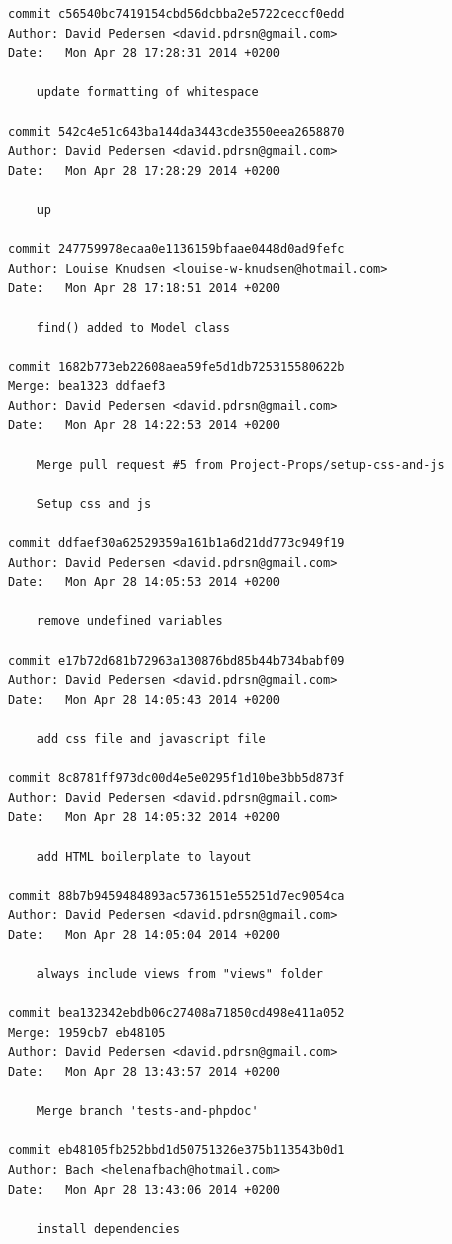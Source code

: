 \documentclass[12pt]{article}
\begin{document}
\begin{verbatim}
commit c56540bc7419154cbd56dcbba2e5722ceccf0edd
Author: David Pedersen <david.pdrsn@gmail.com>
Date:   Mon Apr 28 17:28:31 2014 +0200

    update formatting of whitespace

commit 542c4e51c643ba144da3443cde3550eea2658870
Author: David Pedersen <david.pdrsn@gmail.com>
Date:   Mon Apr 28 17:28:29 2014 +0200

    up

commit 247759978ecaa0e1136159bfaae0448d0ad9fefc
Author: Louise Knudsen <louise-w-knudsen@hotmail.com>
Date:   Mon Apr 28 17:18:51 2014 +0200

    find() added to Model class

commit 1682b773eb22608aea59fe5d1db725315580622b
Merge: bea1323 ddfaef3
Author: David Pedersen <david.pdrsn@gmail.com>
Date:   Mon Apr 28 14:22:53 2014 +0200

    Merge pull request #5 from Project-Props/setup-css-and-js
    
    Setup css and js

commit ddfaef30a62529359a161b1a6d21dd773c949f19
Author: David Pedersen <david.pdrsn@gmail.com>
Date:   Mon Apr 28 14:05:53 2014 +0200

    remove undefined variables

commit e17b72d681b72963a130876bd85b44b734babf09
Author: David Pedersen <david.pdrsn@gmail.com>
Date:   Mon Apr 28 14:05:43 2014 +0200

    add css file and javascript file

commit 8c8781ff973dc00d4e5e0295f1d10be3bb5d873f
Author: David Pedersen <david.pdrsn@gmail.com>
Date:   Mon Apr 28 14:05:32 2014 +0200

    add HTML boilerplate to layout

commit 88b7b9459484893ac5736151e55251d7ec9054ca
Author: David Pedersen <david.pdrsn@gmail.com>
Date:   Mon Apr 28 14:05:04 2014 +0200

    always include views from "views" folder

commit bea132342ebdb06c27408a71850cd498e411a052
Merge: 1959cb7 eb48105
Author: David Pedersen <david.pdrsn@gmail.com>
Date:   Mon Apr 28 13:43:57 2014 +0200

    Merge branch 'tests-and-phpdoc'

commit eb48105fb252bbd1d50751326e375b113543b0d1
Author: Bach <helenafbach@hotmail.com>
Date:   Mon Apr 28 13:43:06 2014 +0200

    install dependencies


\end{verbatim}
\end{document}
